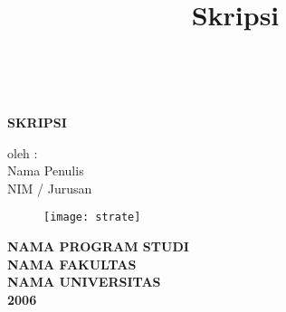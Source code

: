\documentclass[a4paper,12pt]{book}
\title{Skripsi}
\begin{document}
  
\pagestyle{empty}
     
    \begin{titlepage}
      \begin{center}
      {\Large\textbf{    }}\\ %
      \par
      \vspace{3cm}
     
      \textbf{\large SKRIPSI}
      \end{center}
        \vspace{1cm}
      \hspace{6,8cm}oleh :\\
      \hspace{5,5cm} Nama Penulis \\ %
      \hspace{4,3cm}  NIM / Jurusan %
     
      \begin{center}
      \par   
      \vfill 
        \begin{figure}[h]
          \hspace{6cm} 
          \texttt{[image: strate]} %
        \end{figure}
        \vspace*{3cm}
      {\bf \large NAMA PROGRAM STUDI}\\ %
      {\bf \large NAMA FAKULTAS}\\ %
      {\bf \large NAMA UNIVERSITAS}\\ %
      {\bf  \large 2006 } %
      \end{center}
\end{titlepage}
\end{document}
